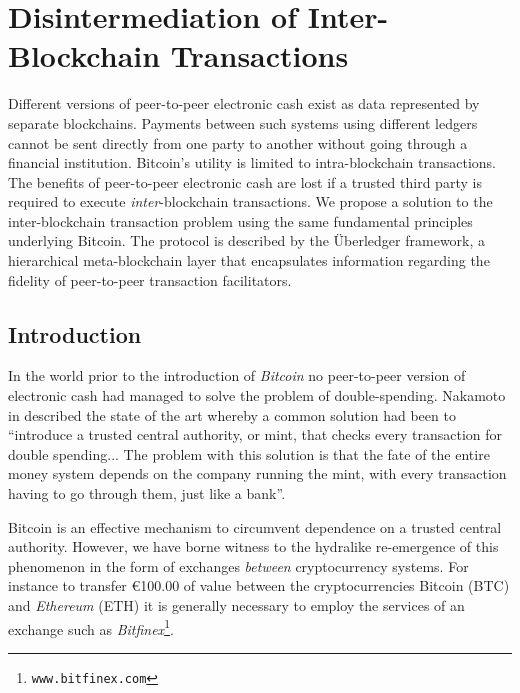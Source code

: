 \chapter{Disintermediation of Inter-Blockchain Transactions\label{cha:chapter4}}

Different versions of peer-to-peer electronic cash exist as data represented by separate blockchains. 
Payments between such systems using different ledgers cannot be sent directly from one party to another without going through a financial institution.
Bitcoin's utility is limited to intra-blockchain transactions.
The benefits of peer-to-peer electronic cash are lost if a trusted third party is required to execute \textit{inter}-blockchain transactions.
We propose a solution to the inter-blockchain transaction problem using the same fundamental principles underlying Bitcoin. 
The protocol is described by the \"{U}berledger framework, a hierarchical meta-blockchain layer that encapsulates information regarding the fidelity of peer-to-peer transaction facilitators. 

\section{Introduction}

In the world prior to the introduction of \emph{Bitcoin} no peer-to-peer version of electronic cash had managed to solve the problem of double-spending.  
Nakamoto in \cite{satoshi2008bitcoin} described the state of the art whereby a common solution had been to \enquote{introduce a trusted central authority, or mint, that checks every transaction for double spending... The problem with this solution is that the fate of the entire money system depends on the company running the mint, with every transaction having to go through them, just like a bank}. 

Bitcoin is an effective mechanism to circumvent dependence on a trusted central authority.
However, we have borne witness to the hydralike re-emergence of this phenomenon in the form of exchanges \textit{between} cryptocurrency systems.
For instance to transfer \euro100.00 of value between the cryptocurrencies Bitcoin (BTC) and \emph{Ethereum} (ETH) it is generally necessary to employ the services of an exchange such as \emph{Bitfinex}\footnote{ \texttt{www.bitfinex.com}}.


